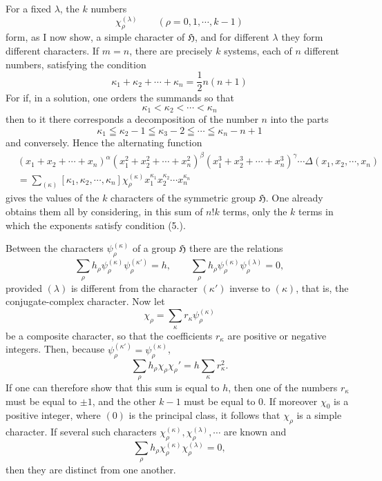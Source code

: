 \documentclass[11pt]{article}
\newcommand{\Hgr}{\mathfrak{H}}
\begin{document}
For a fixed $\lambda$, the $k$ numbers
\[
 \chi_\rho^{(\lambda)}\qquad(\rho=0,1,\cdots,k-1)
\]
form, as I now show, a simple character of $\Hgr$, and for different $\lambda$ they form different characters. If $m=n$, there are precisely $k$ systems, each of $n$ different numbers, satisfying the condition
\begin{equation}\tag{4.}
 \kappa_1+\kappa_2+\cdots+\kappa_n=\frac12 n(n+1)
\end{equation}
For if, in a solution, one orders the summands so that
\begin{equation}\tag{5.}
 \kappa_1<\kappa_2<\cdots<\kappa_n
\end{equation}
then to it there corresponds a decomposition of the number $n$ into the parts
\[
 \kappa_1\leqq \kappa_2-1\leqq \kappa_3-2\leqq\cdots\leqq\kappa_n-n+1
\]
and conversely. Hence the alternating function
\begin{equation}\tag{6.}
\begin{aligned}
 &(x_1+x_2+\cdots+x_n)^\alpha(x_1^2+x_2^2+\cdots+x_n^2)^\beta(x_1^3+x_2^3+\cdots+x_n^3)^\gamma\cdots\Delta(x_1,x_2,\cdots,x_n)\\
 &=\sum_{(\kappa)}[\kappa_1,\kappa_2,\cdots,\kappa_n]\chi_\rho^{(\kappa)}x_1^{\kappa_1}x_2^{\kappa_2}\cdots x_n^{\kappa_n}
\end{aligned}
\end{equation}
gives the values of the $k$ characters of the symmetric group $\Hgr$. One already obtains them all by considering, in this sum of $n!k$ terms, only the $k$ terms in which the exponents satisfy condition (5.).

Between the characters $\psi_\rho^{(\kappa)}$ of a group $\Hgr$ there are the relations
\begin{equation}\tag{7.}
 \sum_\rho h_\rho\psi_\rho^{(\kappa)}\psi_\rho^{(\kappa')}=h,
 \qquad
 \sum_\rho h_\rho\psi_\rho^{(\kappa)}\psi_\rho^{(\lambda)}=0,
\end{equation}
provided $(\lambda)$ is different from the character $(\kappa')$ inverse to $(\kappa)$, that is, the conjugate-complex character.  Now let
\[
 \chi_\rho=\sum_\kappa r_\kappa\psi_\rho^{(\kappa)}
\]
be a composite character, so that the coefficients $r_\kappa$ are positive or negative integers. Then, because $\psi_\rho^{(\kappa')}=\psi_\rho^{(\kappa)}$,
\[
 \sum_\rho h_\rho\chi_\rho\chi_\rho'=h\sum_\kappa r_\kappa^2.
\]
If one can therefore show that this sum is equal to $h$, then one of the numbers $r_\kappa$ must be equal to $\pm1$, and the other $k-1$ must be equal to $0$. If moreover $\chi_0$ is a positive integer, where $(0)$ is the principal class, it follows that $\chi_\rho$ is a simple character. If several such characters $\chi_\rho^{(\kappa)},\chi_\rho^{(\lambda)},\cdots$ are known and
\[
 \sum_\rho h_\rho\chi_\rho^{(\kappa)}\chi_\rho^{(\lambda)}=0,
\]
then they are distinct from one another.
\end{document}

